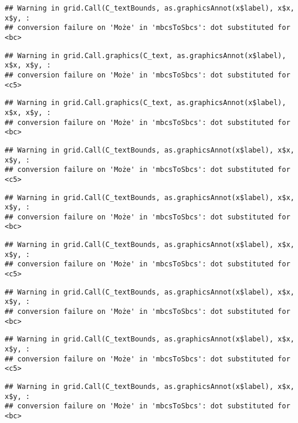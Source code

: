 \documentclass[
]{book}
\begin{document}
\begin{verbatim}
## Warning in grid.Call(C_textBounds, as.graphicsAnnot(x$label), x$x, x$y, :
## conversion failure on 'Może' in 'mbcsToSbcs': dot substituted for <bc>
\end{verbatim}

\begin{verbatim}
## Warning in grid.Call.graphics(C_text, as.graphicsAnnot(x$label), x$x, x$y, :
## conversion failure on 'Może' in 'mbcsToSbcs': dot substituted for <c5>
\end{verbatim}

\begin{verbatim}
## Warning in grid.Call.graphics(C_text, as.graphicsAnnot(x$label), x$x, x$y, :
## conversion failure on 'Może' in 'mbcsToSbcs': dot substituted for <bc>
\end{verbatim}

\begin{verbatim}
## Warning in grid.Call(C_textBounds, as.graphicsAnnot(x$label), x$x, x$y, :
## conversion failure on 'Może' in 'mbcsToSbcs': dot substituted for <c5>
\end{verbatim}

\begin{verbatim}
## Warning in grid.Call(C_textBounds, as.graphicsAnnot(x$label), x$x, x$y, :
## conversion failure on 'Może' in 'mbcsToSbcs': dot substituted for <bc>
\end{verbatim}

\begin{verbatim}
## Warning in grid.Call(C_textBounds, as.graphicsAnnot(x$label), x$x, x$y, :
## conversion failure on 'Może' in 'mbcsToSbcs': dot substituted for <c5>
\end{verbatim}

\begin{verbatim}
## Warning in grid.Call(C_textBounds, as.graphicsAnnot(x$label), x$x, x$y, :
## conversion failure on 'Może' in 'mbcsToSbcs': dot substituted for <bc>
\end{verbatim}

\begin{verbatim}
## Warning in grid.Call(C_textBounds, as.graphicsAnnot(x$label), x$x, x$y, :
## conversion failure on 'Może' in 'mbcsToSbcs': dot substituted for <c5>
\end{verbatim}

\begin{verbatim}
## Warning in grid.Call(C_textBounds, as.graphicsAnnot(x$label), x$x, x$y, :
## conversion failure on 'Może' in 'mbcsToSbcs': dot substituted for <bc>
\end{verbatim}
\end{document}

